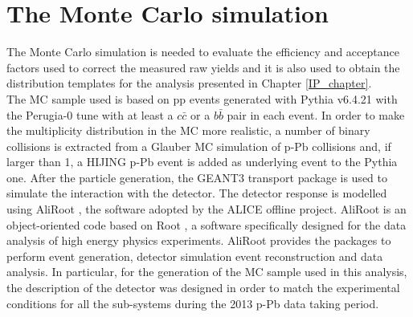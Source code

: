 \documentclass[b5paper,10pt,twoside,oldstyle,classica]{toptesi}
\begin{document}
\section{The Monte Carlo simulation}
\label{MC_sec}
The Monte Carlo simulation is needed to evaluate the efficiency and acceptance factors used to correct the measured raw yields and it is also used to obtain the distribution templates for the analysis presented in Chapter \ref{IP_chapter}. \\
The MC sample used is based on pp events generated with Pythia v6.4.21 with the Perugia-0 \cite{Skands:2009zm} tune with at least a $c\bar{c}$ or a $b\bar{b}$ pair in each event. In order to make the multiplicity distribution in the MC more realistic, a number of binary collisions is extracted from a Glauber MC simulation of p-Pb collisions and, if larger than 1, a HIJING \cite{Wang:1991hta} p-Pb event is added as underlying event to the Pythia one. After the particle generation, the GEANT3 transport package is used to simulate the interaction with the detector. The detector response is modelled using AliRoot \cite{AliRootBib}, the software adopted by the ALICE offline project. AliRoot is an object-oriented code based on Root \cite{RootBib}, a software specifically designed for the data analysis of high energy physics experiments. AliRoot provides the packages to perform event generation, detector simulation event reconstruction and data analysis. In particular, for the generation of the MC sample used in this analysis, the description of the detector was designed in order to match the experimental conditions for all the sub-systems during the 2013 p-Pb data taking period. 
\end{document}
